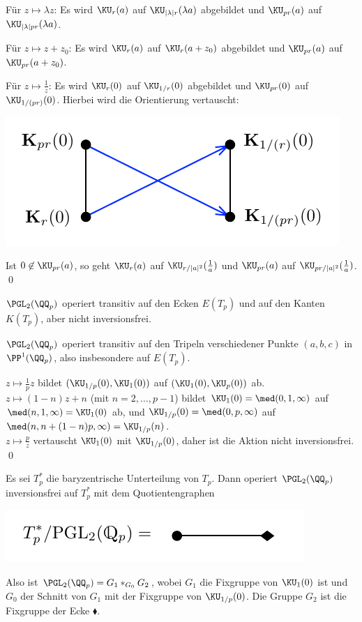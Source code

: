 \begin{itemize}
Für $z\mapsto \lambda z$: Es wird $\KU_r(a)$ auf
$\KU_{|\lambda|r}(\lambda a)$ abgebildet und $\KU_{pr}(a)$ auf
$\KU_{|\lambda|pr}(\lambda a)$.

Für $z\mapsto z+z_0$: Es wird $\KU_r(a)$ auf $\KU_r(a+z_0)$
abgebildet und $\KU_{pr}(a)$ auf $\KU_{pr}(a+z_0)$.

Für $z\mapsto\frac{1}{z}$: Es wird $\KU_r(0)$ auf
$\KU_{1/r}(0)$ abgebildet und $\KU_{pr}(0)$ auf
$\KU_{1/(pr)}(0)$. Hierbei wird die Orientierung vertauscht:
\begin{center}
	\includegraphics{grugraImages/vertauscht}
\end{center}
Ist $0\not\in \KU_{pr}(a)$, so geht $\KU_{r}(a)$ auf
$\KU_{r/|a|^2}(\frac{1}{a})$ und $\KU_{pr}(a)$ auf
$\KU_{pr/|a|^2}(\frac{1}{a})$.
\qed
\end{itemize}

\BEM $\PGL_2(\QQ_p)$ operiert transitiv auf den Ecken $E(T_p)$
und auf den Kanten $K(T_p)$, aber nicht inversionsfrei.

\bew $\PGL_2(\QQ_p)$ operiert transitiv auf den Tripeln verschiedener
Punkte $(a,b,c)$ in $\PP^1(\QQ_p)$, also insbesondere auf $E(T_p)$.

$z\mapsto \frac{1}{p}z$ bildet $(\KU_{1/p}(0),\KU_1(0))$ auf
$(\KU_1(0),\KU_p(0))$ ab.\\
$z\mapsto (1-n)z+n$ (mit $n=2,\ldots,p-1$) bildet
$\KU_1(0)=\med(0,1,\infty)$ auf $\med(n,1,\infty)=\KU_1(0)$ ab,
und $\KU_{1/p}(0)=\med(0,p,\infty)$ auf $\med(n,n+(1-n)p,\infty)
=\KU_{1/p}(n)$.\\
$z\mapsto \frac{p}{z}$ vertauscht $\KU_1(0)$ mit $\KU_{1/p}(0)$,
daher ist die Aktion nicht inversionsfrei.
\qed

\FOLG Es sei $T_p^*$ die baryzentrische Unterteilung von $T_p$.
Dann operiert $\PGL_2(\QQ_p)$ inversionsfrei auf $T_p^*$ mit dem
Quotientengraphen
\begin{center}
	\includegraphics{grugraImages/pglQuotient}
\end{center}
Also ist $\PGL_2(\QQ_p) = G_1 *_{G_0} G_2$, wobei $G_1$ die Fixgruppe
von $\KU_1(0)$ ist und $G_0$ der Schnitt von $G_1$ mit
der Fixgruppe
von $\KU_{1/p}(0)$. Die Gruppe $G_2$ ist die Fixgruppe der Ecke
$\blacklozenge$.

